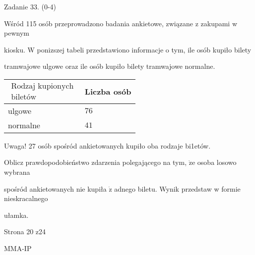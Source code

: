 \documentclass[a4paper,12pt]{article}
\begin{document}
Zadanie 33. (0-4)

Wśród 115 osób przeprowadzono badania ankietowe, związane z zakupami w pewnym

kiosku. W ponizszej tabeli przedstawiono informacje o tym, ile osób kupiło bilety

tramwajowe ulgowe oraz ile osób kupiło bilety tramwajowe normalne.
\begin{center}
\begin{tabular}{|l|l|}
\hline
\multicolumn{1}{|l|}{$\begin{array}{l}\mbox{Rodzaj kupionych}	\\	\mbox{biletów}	\end{array}$}&	\multicolumn{1}{|l|}{Liczba osób}	\\
\hline
\multicolumn{1}{|l|}{ulgowe}&	\multicolumn{1}{|l|}{$76$}	\\
\hline
\multicolumn{1}{|l|}{normalne}&	\multicolumn{1}{|l|}{$41$}	\\
\hline
\end{tabular}

\end{center}
Uwaga! 27 osób spośród ankietowanych kupiło oba rodzaje bi1etów.

Oblicz prawdopodobieństwo zdarzenia polegającego na tym, $\dot{\mathrm{z}}\mathrm{e}$ osoba losowo wybrana

spośród ankietowanych nie kupiła $\dot{\mathrm{z}}$ adnego biletu. Wynik przedstaw w formie nieskracalnego

ułamka.

Strona 20 z24

MMA-IP
\end{document}
